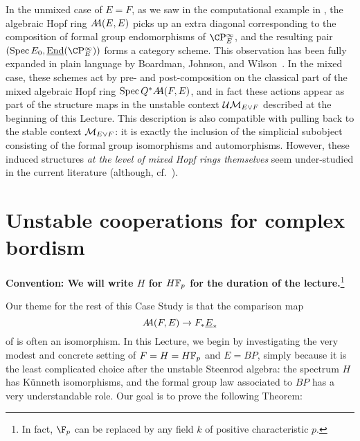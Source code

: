 \begin{remark}
In the unmixed case of \(E = F\), as we saw in the computational example in , the algebraic Hopf ring \(\AA(E, E)\) picks up an extra diagonal corresponding to the composition of formal group endomorphisms of \(\CP^\infty_E\), and the resulting pair \((\Spec E_0, \underline{\operatorname{End}}(\CP^\infty_E))\) forms a category scheme.  This observation has been fully expanded in plain language by Boardman, Johnson, and Wilson~\cite[Section 10]{BJW}.  In the mixed case, these schemes act by pre- and post-composition on the classical part of the mixed algebraic Hopf ring \(\Spec Q^* \AA(F, E)\), and in fact these actions appear as part of the structure maps in the unstable context \(\Ucontext{E \vee F}\) described at the beginning of this Lecture.  This description is also compatible with pulling back to the stable context \(\context{E \vee F}\): it is exactly the inclusion of the simplicial subobject consisting of the formal group isomorphisms and automorphisms.  However, these induced structures \emph{at the level of mixed Hopf rings themselves} seem under-studied in the current literature (although, cf.\ \cite[Remark 2.6]{HopkinsHunton}).
\end{remark}













\section{Unstable cooperations for complex bordism}\label{COableCoopnsII}

\begin{center}
\textbf{Convention: We will write \(H\) for \(\HFp\) for the duration of the lecture.}\footnote{In fact, \(\F_p\) can be replaced by any field \(k\) of positive characteristic \(p\).}
\end{center}

Our theme for the rest of this Case Study is that the comparison map \[\AA(F, E) \to F_* \OS{E}{*}\] of  is often an isomorphism.  In this Lecture, we begin by investigating the very modest and concrete setting of \(F = H = \HFp\) and \(E = BP\), simply because it is the least complicated choice after the unstable Steenrod algebra: the spectrum \(H\) has K\"unneth isomorphisms, and the formal group law associated to \(BP\) has a very understandable role.  Our goal is to prove the following Theorem:

